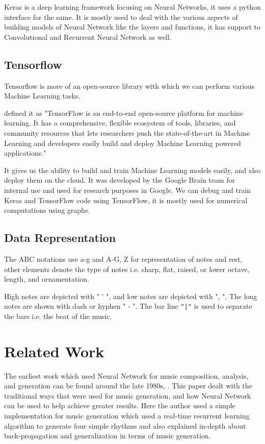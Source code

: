 \documentclass[oneside,12pt]{Classes/RoboticsLaTeX}
\begin{document}
Keras is a deep learning framework focusing on Neural Networks, it uses a python interface for the same. It is mostly used to deal with the various aspects of building models of Neural Network like the layers and functions, it has support to Convolutional and Recurrent Neural Network as well.

\section{Tensorflow}

Tensorflow is more of an open-source library with which we can perform various Machine Learning tasks.

\cite{tensorflow} defined it as "TensorFlow is an end-to-end open-source platform for machine learning. It has a comprehensive, flexible ecosystem of tools, libraries, and community resources that lets researchers push the state-of-the-art in Machine Learning and developers easily build and deploy Machine Learning powered applications."

It gives us the ability to build and train Machine Learning models easily, and also deploy them on the cloud. It was developed by the Google Brain team for internal use and used for research purposes in Google. We can debug and train Keras and TensorFlow code using TensorFlow, it is mostly used for numerical computations using graphs.

\section{Data Representation}

The ABC notations use a-g and A-G, Z for representation of notes and rest, other elements denote the type of notes i.e. sharp, flat, raised, or lower octave, length, and ornamentation.

High notes are depicted with " ' ", and low notes are depicted with ", ". The long notes are shown with dash or hyphen " - ". The bar line \verb+"|"+ is used to separate the bars i.e. the beat of the music.



\chapter{Related Work}
\label{chap:rel_work}

The earliest work which used Neural Network for music composition, analysis, and generation can be found around the late 1980s, \cite{mdolson}. This paper dealt with the traditional ways that were used for music generation, and how Neural Network can be used to help achieve greater results. Here the author used a simple implementation for music generation which used a real-time recurrent learning algorithm to generate four simple rhythms and also explained in-depth about back-propagation and generalization in terms of music generation. 
\end{document}
